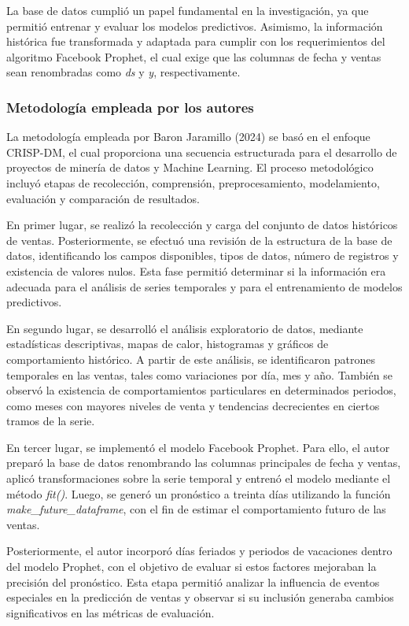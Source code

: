 La base de datos cumplió un papel fundamental en la investigación, ya que permitió entrenar y evaluar los modelos predictivos. Asimismo, la información histórica fue transformada y adaptada para cumplir con los requerimientos del algoritmo Facebook Prophet, el cual exige que las columnas de fecha y ventas sean renombradas como \textit{ds} y \textit{y}, respectivamente.

\subsubsection{Metodología empleada por los autores}

La metodología empleada por Baron Jaramillo (2024) se basó en el enfoque CRISP-DM, el cual proporciona una secuencia estructurada para el desarrollo de proyectos de minería de datos y Machine Learning. El proceso metodológico incluyó etapas de recolección, comprensión, preprocesamiento, modelamiento, evaluación y comparación de resultados.

En primer lugar, se realizó la recolección y carga del conjunto de datos históricos de ventas. Posteriormente, se efectuó una revisión de la estructura de la base de datos, identificando los campos disponibles, tipos de datos, número de registros y existencia de valores nulos. Esta fase permitió determinar si la información era adecuada para el análisis de series temporales y para el entrenamiento de modelos predictivos.

En segundo lugar, se desarrolló el análisis exploratorio de datos, mediante estadísticas descriptivas, mapas de calor, histogramas y gráficos de comportamiento histórico. A partir de este análisis, se identificaron patrones temporales en las ventas, tales como variaciones por día, mes y año. También se observó la existencia de comportamientos particulares en determinados periodos, como meses con mayores niveles de venta y tendencias decrecientes en ciertos tramos de la serie.

En tercer lugar, se implementó el modelo Facebook Prophet. Para ello, el autor preparó la base de datos renombrando las columnas principales de fecha y ventas, aplicó transformaciones sobre la serie temporal y entrenó el modelo mediante el método \textit{fit()}. Luego, se generó un pronóstico a treinta días utilizando la función \textit{make\_future\_dataframe}, con el fin de estimar el comportamiento futuro de las ventas.

Posteriormente, el autor incorporó días feriados y periodos de vacaciones dentro del modelo Prophet, con el objetivo de evaluar si estos factores mejoraban la precisión del pronóstico. Esta etapa permitió analizar la influencia de eventos especiales en la predicción de ventas y observar si su inclusión generaba cambios significativos en las métricas de evaluación.


